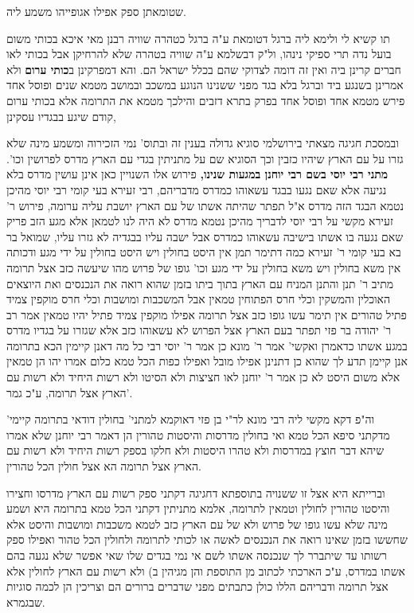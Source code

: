 \documentclass[12pt, openany]{book}
\begin{document}
{שטומאתן ספק אפילו אגופייהו משמע ליה.\par תו קשיא לי ולימא ליה ברגל דטומאת ע"ה ברגל כטהרה שוויה רבנן מאי איכא בכותי משום בועל נדה תרי ספיקי נינהו, ול"ק דבשלמא ע"ה שוויה בטהרה שלא להרחיקן אבל בכותי לאו חברים קרינן ביה ואין זה דומה לצדוקי שהם בכלל ישראל הם. 
והא דמפרקינן ב\textbf{כותי ערום}  ולא אמרינן בשנגע ביד וברגל בלא בגד מפני ששנינו הנוגע במשכב ובמושב מטמא שנים ופוסל אחד פירש מטמא אחד ופוסל אחד בפרק בתרא דזבים והילכך מטמא את התרומה אלא בכותי ערום קודם שיגע בבגדיו עסקינן,\par ובמסכת חגיגה מצאתי בירושלמי סוגיא גדולה בענין זה ובתוס' נמי הזכירוה ומשמע מינה שלא גזרו על עם הארץ שיהיו כזבין וכך הסוגיא שם על מתניתין בגדי עם הארץ מדרס לפרושין וכו'. 
\textbf{מתני רבי יוסי בשם רבי יוחנן במגעות שנינו,}  פירוש אלו השנויין כאן אינן עושין מדרס בלא נגיעה אלא שאם נגעו בבגד עשאוהו כמדרס מדבריהם, רבי זעירא בעי קומי רבי יוסי מהיכן נטמא הבגד הזה מדרס א"ל תפתר שהיתה אשתו של עם הארץ יושבת עליה ערומה, פירוש ר' זעירא מקשי על רבי יוסי לדבריך מהיכן נטמא מדרס לא היה לנו לטמאן אלא מגע הזב פריק שאם נגעה בו אשתו בישיבה עשאוהו כמדרס אבל ישבה עליו בבגדיה לא גזרו עליו, שמואל בר בא בעי קומי ר' זעירא כמה דתימר תמן אין היסט בחולין ויש היסט בחולין על ידי מגע ודכותה אין משא בחולין ויש משא בחולין על ידי מגע וכו' גופו של פרוש מהו שיעשה כזב אצל תרומה מתיב ר' תנן והתנן המניח עם הארץ בתוך ביתו בזמן שהוא רואה את הנכנסים ואת היוצאים האוכלין והמשקין וכלי חרס הפתוחין טמאין אבל המשכבות ומושבות וכלי חרס מוקפין צמיד פתיל טהורים אין תימר עשו גופו כזב אצל תרומה אפילו מוקפין צמיד פתיל יהיו טמאין אמר רב ר' יהודה בר פזי תפתר בעם הארץ אצל הפרוש לא עשאוהו כזב אלא שגזרו על בגדיו מדרס במגע אשתו כדאמרן ואקשי' אמר ר' מונא כן אמר ר' יוסי רבי כל מה דאנן קיימין הכא בתרומה אנן קיימן תדע לך שהוא כן דתנינן אפילו מובל ואפילו כפות הכל טמא כלום אמרו יהו הן טמאין אלא משום היסט לא כן אמר ר' יוחנן לאו חציצות ולא הסיטו ולא רשות היחיד ולא רשות עם הארץ אצל תרומה, ע"כ גמר'.\par  וה"פ דקא מקשי ליה רבי מונא לר"י בן פזי דאוקמא למתני' בחולין דודאי בתרומה קיימי' מדקתני סיפא הכל טמא ואי בחולין מדרסות והיסטות טהורין הן דאמר רבי יוחנן שלא אמרו שיהא דבר חוצץ במדרסות ולא טהרו היסטות ולא חלקו בספק רשות היחיד ולא רשות עם הארץ אצל תרומה הא אצל חולין הכל טהורין.\par וברייתא היא אצל זו ששנויה בתוספתא דחגיגה דקתני ספק רשות עם הארץ מדרסו וחצירו והיסטו טהורין לחולין וטמאין לתרומה, אלמא מתניתין דקתני הכל טמא בתרומה היא ושמע מינה שלא עשו גופו של פרוש ולא של עם הארץ כזב לטמא משכבות ומושבות והיסט אלא שחששו בזמן שאינו רואה את הנכנסים לאשה או לכותי לתרומה ולחולין הכל טהור ואפילו ספק רשותו עד שיתברר לך שנכנסה אשתו לשם אי נמי בגדים שלו שאי אפשר שלא נגעה בהם אשתו במדרס, ע"כ הארכתי לכתוב מן התוספת והן מגיהין ב) ולא רשות עם הארץ לחולין אלא אצל תרומה ודבריהם הללו כולן כתבתים מפני שדברים ברורים הם וצריכין הן לכמה סוגיות שבגמרא. 
}
\end{document}
